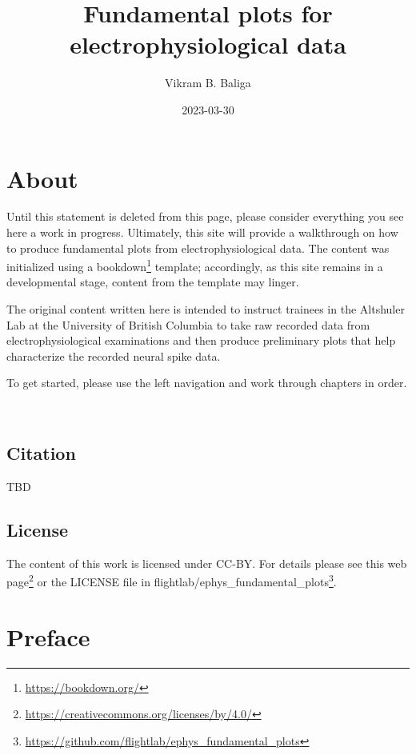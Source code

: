 \documentclass[
]{book}
\title{Fundamental plots for electrophysiological data}
\author{Vikram B. Baliga}
\date{2023-03-30}
\DeclareRobustCommand{\href}[2]{#2\footnote{\url{#1}}}
\begin{document}
\maketitle

{
\setcounter{tocdepth}{1}
\tableofcontents
}
\hypertarget{about}{%
\chapter{About}\label{about}}

Until this statement is deleted from this page, please consider everything you
see here a work in progress. Ultimately, this site will provide a walkthrough on
how to produce fundamental plots from electrophysiological data. The content
was initialized using a \href{https://bookdown.org/}{bookdown} template; accordingly,
as this site remains in a developmental stage, content from the template may
linger.

The original content written here is intended to instruct trainees in the
Altshuler Lab at the University of British Columbia to take raw recorded data
from electrophysiological examinations and then produce preliminary plots that
help characterize the recorded neural spike data.

To get started, please use the left navigation and work through chapters in
order.

🐢

\hypertarget{citation}{%
\section*{Citation}\label{citation}}

TBD

\hypertarget{license}{%
\section*{License}\label{license}}

The content of this work is licensed under CC-BY. For details please see
\href{https://creativecommons.org/licenses/by/4.0/}{this web page} or the LICENSE
file in \href{https://github.com/flightlab/ephys_fundamental_plots}{flightlab/ephys\_fundamental\_plots}.

\hypertarget{preface}{%
\chapter{Preface}\label{preface}}
\end{document}
